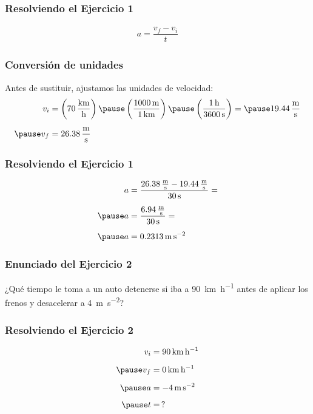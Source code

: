\documentclass[14pt]{beamer}
\begin{document}
\begin{frame}
\frametitle{Resolviendo el Ejercicio 1}
\pause
\begin{align*}
a = \dfrac{v_{f} - v_{i}}{t}
\end{align*}
\end{frame}
\begin{frame}
\frametitle{Conversión de unidades}
Antes de sustituir, ajustamos las unidades de velocidad:
\begin{eqnarray*}
\begin{aligned}
v_{i} &= \left( \SI[per-mode=fraction]{70}{\kilo\meter\per\hour} \right) \pause \left( \dfrac{\SI{1000}{\meter}}{\SI{1}{\kilo\meter}} \right) \pause \left( \dfrac{\SI{1}{\hour}}{\SI{3600}{\second}} \right) = \pause \SI[per-mode=fraction]{19.44}{\meter\per\second} \\[0.5em] \pause
v_{f} &= \SI[per-mode=fraction]{26.38}{\meter\per\second}
\end{aligned}
\end{eqnarray*}
\end{frame}
\begin{frame}
\frametitle{Resolviendo el Ejercicio 1}
\pause
\begin{eqnarray*}
\begin{aligned}
a &= \dfrac{\SI[per-mode=fraction]{26.38}{\meter\per\second} - \SI[per-mode=fraction]{19.44}{\meter\per\second}}{\SI{30}{\second}} = \\[0.5em] \pause
a &= \dfrac{\SI[per-mode=fraction]{6.94}{\meter\per\second}}{\SI{30}{\second}} = \\[0.5em] \pause
a &= \SI{0.2313}{\meter\per\square\second}
\end{aligned}
\end{eqnarray*}
\end{frame}
\begin{frame}
\frametitle{Enunciado del Ejercicio 2}
¿Qué tiempo le toma a un auto detenerse si iba a \SI{90}{\kilo\meter\per\hour} antes de aplicar los frenos y desacelerar a \SI{4}{\meter\per\square\second}?
\end{frame}
\begin{frame}
\frametitle{Resolviendo el Ejercicio 2}
\pause
\begin{eqnarray*}
\begin{aligned}
v_{i} &= \SI{90}{\kilo\meter\per\hour} \\[0.5em] \pause
v_{f} &= \SI{0}{\kilo\meter\per\hour} \\[0.5em] \pause
a &= - \SI{4}{\meter\per\square\second} \\[0.5em] \pause
t &= \, ?
\end{aligned}
\end{eqnarray*}
\end{frame}
\end{document}
